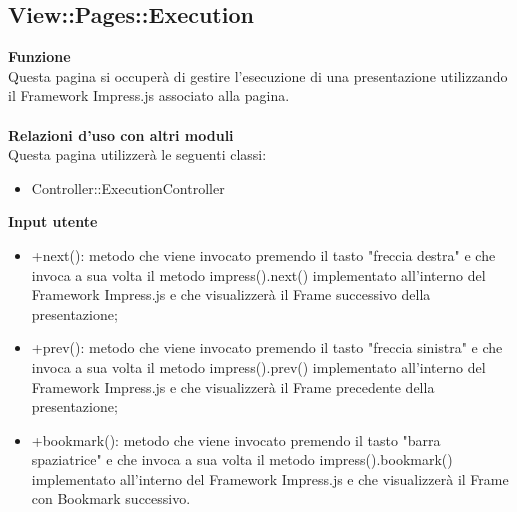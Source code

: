 {\subsection{View::Pages::Execution}{
	\textbf{Funzione}\\
	\indent Questa pagina si occuperà di gestire l'esecuzione di una presentazione utilizzando il Framework Impress.js associato alla pagina.\\\\
	\textbf{Relazioni d'uso con altri moduli}\\
	\indent Questa pagina utilizzerà le seguenti classi:
	\begin{itemize}
		\item Controller::ExecutionController
	\end{itemize}
	\textbf{Input utente}
	\begin{itemize}
		\item +next(): metodo che viene invocato premendo il tasto "freccia destra" e che invoca a sua volta il metodo impress().next() implementato all'interno del Framework Impress.js e che visualizzerà il Frame successivo della presentazione;
		\item +prev(): metodo che viene invocato premendo il tasto "freccia sinistra" e che invoca a sua volta il metodo impress().prev() implementato all'interno del Framework Impress.js e che visualizzerà il Frame precedente della presentazione;
		\item +bookmark(): metodo che viene invocato premendo il tasto "barra spaziatrice" e che invoca a sua volta il metodo impress().bookmark() implementato all'interno del Framework Impress.js e che visualizzerà il Frame con Bookmark successivo.
	\end{itemize}
}
}
